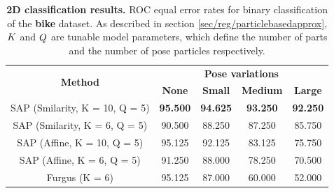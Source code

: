 \begin{table}
	\centering
	\begin{tabular}{|c|c|c|c|c|}
		\hline
		\multirow{2}{*}{\textbf{Method}} & \multicolumn{4}{c|}{\textbf{Pose variations}} \\
		\cline{2-5}
		& \textbf{None} & \textbf{Small} & \textbf{Medium} & \textbf{Large} \\
		\hline
		SAP (Smilarity, K = 10, Q = 5) & \textbf{\color{blue}95.500} & \textbf{\color{blue}94.625} & \textbf{\color{blue}93.250} & \textbf{\color{blue}92.250} \\
		\hline
		SAP (Smilarity, K = 6, Q = 5) & 90.500 & 88.250 & 87.250 & 85.750 \\ 
		\hline
		SAP (Affine, K = 10, Q = 5) & 95.125 & 92.125 & 83.125 & 75.750 \\ 
		SAP (Affine, K = 6, Q = 5) & 91.250 & 88.000 & 78.250 & 70.500 \\ 
		\hline
		Furgus \etal \cite{Fergus2007} (K = 6) & 95.125 & 87.000 & 60.000 & 52.000 \\
		\hline
	\end{tabular}
	\caption{\textbf{2D classification results.} ROC equal error rates for binary classification of the \textbf{bike} dataset. As described in section \ref{sec/reg/particlebasedapprox}, $K$ and $Q$ are tunable model parameters, which define the number of parts and the number of pose particles respectively.} 
	\label{tab/reg/regresult2d}
\end{table}

